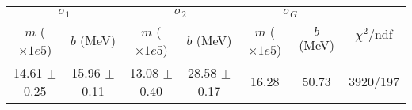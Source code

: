 \begin{tabular}{cc|cc|cc||c}
\multicolumn{2}{c|}{$\sigma_1$} & \multicolumn{2}{|c}{$\sigma_2$} & \multicolumn{2}{|c}{$\sigma_G$}  & \multirow{2}{*}{$\chi^2/$ndf}\\
$m$ ($\times1e5$) & $b$ (MeV) & $m$ ($\times1e5$) & $b$ (MeV) & $m$ ($\times1e5$) & $b$ (MeV) & \\
\hline
14.61 $\pm$ 0.25 & 15.96 $\pm$ 0.11 & 13.08 $\pm$ 0.40 & 28.58 $\pm$ 0.17 & 16.28 & 50.73 & 3920/197\\
\end{tabular}
